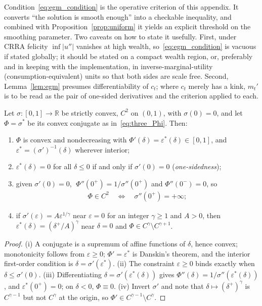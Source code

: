 Condition~\eqref{eq:egm_condition} is the operative criterion of this appendix. It
converts ``the solution is smooth enough'' into a checkable inequality, and combined
with Proposition~\ref{prop:uniform} it yields an explicit threshold on the smoothing
parameter. Two caveats on how to state it usefully. First, under CRRA felicity
$\inf|u''|$ vanishes at high wealth, so~\eqref{eq:egm_condition} is vacuous if stated
globally; it should be stated on a compact wealth region, or, preferably and in
keeping with the implementation, in inverse-marginal-utility
(consumption-equivalent) units so that both sides are scale free. Second,
Lemma~\ref{lem:egm} presumes differentiability of $c_t$; where $c_t$ merely has a kink,
$m_t'$ is to be read as the pair of one-sided derivatives and the criterion applied to
each.

\begin{lemma}
\label{lem:conjugate}
Let $\sigma:[0,1]\to\mathbb{R}$ be strictly convex, $C^{2}$ on $(0,1)$, with
$\sigma(0)=0$, and let $\Phi=\sigma^{\ast}$ be its convex conjugate as
in~\eqref{eq:three_Phi}. Then:
\begin{enumerate}
    \item $\Phi$ is convex and nondecreasing with $\Phi'(\delta)=\varepsilon^{\ast}(\delta)\in[0,1]$,
    and $\varepsilon^{\ast}=(\sigma')^{-1}(\delta)$ wherever interior;
    \item $\varepsilon^{\ast}(\delta)=0$ for all $\delta\le 0$ if and only if $\sigma'(0)=0$
    (\emph{one-sidedness});
    \item given $\sigma'(0)=0$, $\;\Phi''(0^{+})=1/\sigma''(0^{+})$ and
    $\Phi''(0^{-})=0$, so
    \begin{align}
    \Phi\in C^{2}\quad\Longleftrightarrow\quad \sigma''(0^{+})=+\infty ;
    \end{align}
    \item if $\sigma'(\varepsilon)= A\varepsilon^{1/\gamma}$ near $\varepsilon=0$ for an
    integer $\gamma\ge 1$ and $A>0$, then $\varepsilon^{\ast}(\delta)=(\delta^{+}/A)^{\gamma}$
    near $\delta=0$ and $\Phi\in C^{\gamma}\setminus C^{\gamma+1}$.
\end{enumerate}
\end{lemma}

\begin{proof}
(i) A conjugate is a supremum of affine functions of $\delta$, hence convex;
monotonicity follows from $\varepsilon\ge0$; $\Phi'=\varepsilon^{\ast}$ is Danskin's
theorem, and the interior first-order condition is $\delta=\sigma'(\varepsilon^{\ast})$.
(ii) The constraint $\varepsilon\ge0$ binds exactly when $\delta\le\sigma'(0)$.
(iii) Differentiating $\delta=\sigma'(\varepsilon^{\ast}(\delta))$ gives
$\Phi''(\delta)=1/\sigma''(\varepsilon^{\ast}(\delta))$, and $\varepsilon^{\ast}(0^{+})=0$;
on $\delta<0$, $\Phi\equiv0$. (iv) Invert $\sigma'$ and note that
$\delta\mapsto(\delta^{+})^{\gamma}$ is $C^{\gamma-1}$ but not $C^{\gamma}$ at the
origin, so $\Phi'\in C^{\gamma-1}\setminus C^{\gamma}$.
\end{proof}

